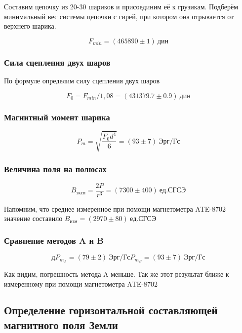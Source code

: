 \documentclass[a4paper, 12pt]{article}
\begin{document}
                Составим цепочку из 20-30 шариков и присоединим её к грузикам. Подберём минимальный вес системы цепочки с гирей, при котором она отрывается от верхнего шарика.

                $$
                    F_{min} = (465890 \pm 1)~дин
                $$

            \subsubsection{Сила сцепления двух шаров}

                По формуле определим силу сцепления двух шаров

                $$
                    F_0 = F_{min} / 1,08 = (431379.7 \pm 0.9)~дин
                $$

            \subsubsection{Магнитный момент шарика}

                $$
                    P_m = \sqrt{\frac{F_0 d^4}{6}} = (93 \pm 7)~Эрг/Гс
                $$

            \subsubsection{Величина поля на полюсах}

                $$
                    B_{эксп} = \frac{2P}{r^3} = (7300 \pm 400)~ед. СГСЭ
                $$

                Напомним, что среднее измеренное при помощи магнетометра ATE-8702 значение составило $B_{изм} = (2970 \pm 80)~ед. СГСЭ$

            \subsubsection{Сравнение методов A и B}

                $$д
                    P_{m_A} = (79 \pm 2)~Эрг/Гс
                    P_{m_B} = (93 \pm 7)~Эрг/Гс
                $$

                Как видим, погрешность метода A меньше. Так же этот результат ближе к измеренному при помощи магнетометра ATE-8702

        \subsection{Определение горизонтальной составляющей магнитного поля Земли}
\end{document}
